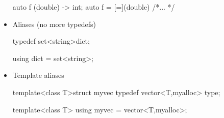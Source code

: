 \begin{itemize}
\begin{minipage}{\MPWxXXSxLISTING\textwidth}
\begin{CPPCode}
        \end{CPPCode}
    \end{minipage}
    \begin{minipage}{\MPWxXXSxLISTING\textwidth} %
        \begin{CPPCode}
auto f (double) -> int;
auto f = [=](double) { /*... */ }
        \end{CPPCode}
    \end{minipage}

    \item Aliases (no more typedefs)\\
    \begin{minipage}{\MPWxXXSxLISTING\textwidth} %
{} %
        \begin{CPPCode}
typedef set<string>dict;
        \end{CPPCode}
    \end{minipage}
    \begin{minipage}{\MPWxXXSxLISTING\textwidth} %
        \begin{CPPCode}
using dict = set<string>;
        \end{CPPCode}
    \end{minipage}

    \item Template aliases\\
    \begin{minipage}{\MPWxXXSxLISTING\textwidth} %
{} %
        \begin{CPPCode}
template<class T>struct myvec
{typedef vector<T,myalloc> type;}
        \end{CPPCode}
    \end{minipage}
    \begin{minipage}{\MPWxXXSxLISTING\textwidth} %
        \begin{CPPCode}
template<class T>
using myvec = vector<T,myalloc>;
        \end{CPPCode}
    \end{minipage}
\end{itemize}
